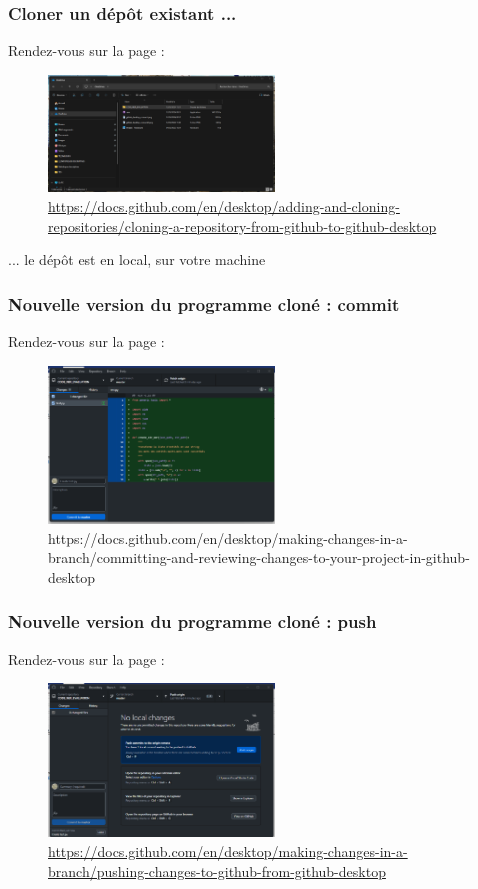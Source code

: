 \begin{frame}
  \frametitle{Cloner un dépôt existant ...}

Rendez-vous sur la page : 
\begin{figure}
\caption{\url{https://docs.github.com/en/desktop/adding-and-cloning-repositories/cloning-a-repository-from-github-to-github-desktop}}
  \includegraphics[width=6cm]{images/github_desktop_connect3.png}
  \end{figure}
  ... le dépôt est en local, sur votre machine 
\end{frame}

\begin{frame}
  \frametitle{Nouvelle version du programme cloné : commit}

Rendez-vous sur la page : 
\begin{figure}
\caption{https://docs.github.com/en/desktop/making-changes-in-a-branch/committing-and-reviewing-changes-to-your-project-in-github-desktop}
  \includegraphics[width=6cm]{images/github_desktop_connect4.png}
  \end{figure}

\end{frame}



\begin{frame}
  \frametitle{Nouvelle version du programme cloné : push}

Rendez-vous sur la page : 
\begin{figure}
\caption{\url{https://docs.github.com/en/desktop/making-changes-in-a-branch/pushing-changes-to-github-from-github-desktop}}
  \includegraphics[width=6cm]{images/github_desktop_connect5.png}
  \end{figure}
  
\end{frame}

